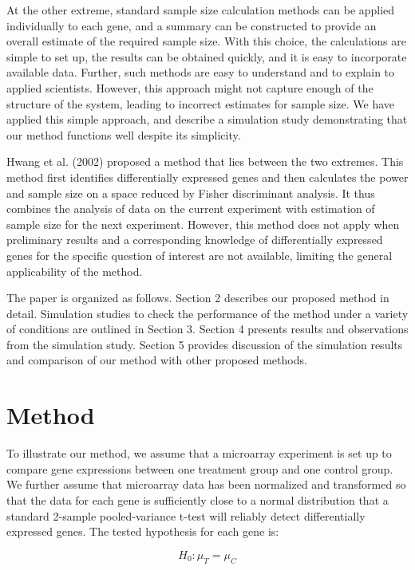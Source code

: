 \documentclass{bioinfo}
\begin{document}
At the other extreme, standard sample size calculation methods can
be applied individually to each gene, and a summary can be
constructed to provide an overall estimate of the required sample
size.  With this choice, the calculations are simple to set up, the
results can be obtained quickly, and it is easy to incorporate
available data. Further, such methods are easy to understand and to
explain to applied scientists.  However, this approach might not
capture enough of the structure of the system, leading to incorrect
estimates for sample size.  We have applied this simple approach,
and describe a simulation study demonstrating that our method
functions well despite its simplicity.

Hwang et al. (2002) proposed a method that lies between the two
extremes.  This method first identifies differentially expressed
genes and then calculates the power and sample size on a space
reduced by Fisher discriminant analysis. It thus combines the
analysis of data on the current experiment with estimation of sample
size for the next experiment. However, this method does not apply
when preliminary results and a corresponding knowledge of
differentially expressed genes for the specific question of interest
are not available, limiting the general applicability of the
method.

The paper is organized as follows. Section 2 describes our proposed
method in detail. Simulation studies to check the performance of the
method under a variety of conditions are outlined in Section 3.
Section 4 presents results and observations from the simulation
study.  Section 5 provides discussion of the simulation results and
comparison of our method with other proposed methods.

\section{Method}
To illustrate our method, we assume that a microarray experiment is
set up to compare gene expressions between one treatment group and
one control group. We further assume that microarray data has been
normalized and transformed so that the data for each gene is
sufficiently close to a normal distribution that a standard 2-sample
pooled-variance t-test will reliably detect differentially expressed
genes. The tested hypothesis for each gene is:

\begin{equation}
  H_0: \mu_{T} = \mu_{C}  \nonumber
\end{equation}
\end{document}
